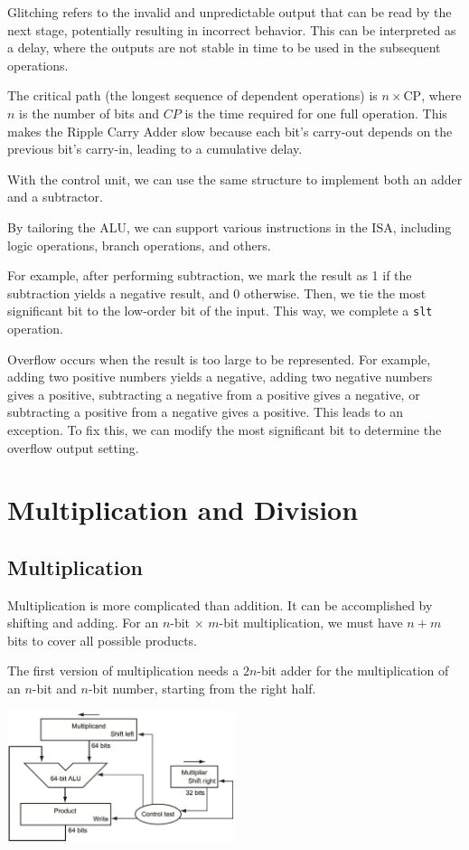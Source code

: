 Glitching refers to the invalid and unpredictable output that can be read by the next stage, potentially resulting in incorrect behavior. This can be interpreted as a delay, where the outputs are not stable in time to be used in the subsequent operations.

The critical path (the longest sequence of dependent operations) is \(n \times \text{CP}\), where \(n\) is the number of bits and \(CP\) is the time required for one full operation. This makes the Ripple Carry Adder slow because each bit's carry-out depends on the previous bit's carry-in, leading to a cumulative delay.

With the control unit, we can use the same structure to implement both an adder and a subtractor. 

By tailoring the ALU, we can support various instructions in the ISA, including logic operations, branch operations, and others. 

For example, after performing subtraction, we mark the result as 1 if the subtraction yields a negative result, and 0 otherwise. Then, we tie the most significant bit to the low-order bit of the input. This way, we complete a \verb|slt| operation. 

Overflow occurs when the result is too large to be represented. For example, adding two positive numbers yields a negative, adding two negative numbers gives a positive, subtracting a negative from a positive gives a negative, or subtracting a positive from a negative gives a positive. This leads to an exception. To fix this, we can modify the most significant bit to determine the overflow output setting.

\section{Multiplication and Division}

\subsection{Multiplication}
Multiplication is more complicated than addition. It can be accomplished by shifting and adding. For an \(n\)-bit \(\times\) \(m\)-bit multiplication, we must have \(n + m\) bits to cover all possible products.

The first version of multiplication needs a \(2n\)-bit adder for the multiplication of an \(n\)-bit and \(n\)-bit number, starting from the right half.
\begin{center}
  \includegraphics[width=0.5\textwidth]{Figure/mul_1.png}
\end{center}

